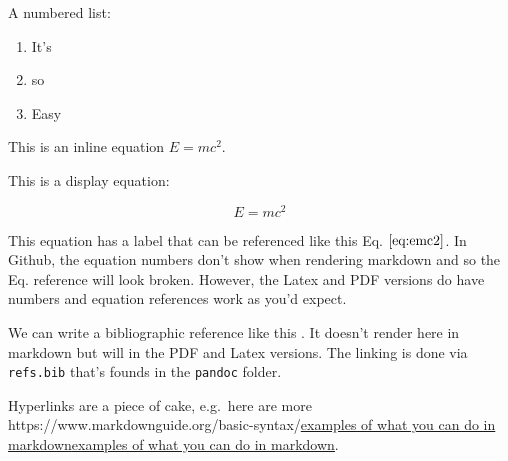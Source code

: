 \documentclass[
]{article}
\let\oldhref\href
\renewcommand{\href}[2]{\ifx#1\urlprefix\oldhref{#1}{#2}\else\uline{\oldhref{#1}{#2}}\fi}
\renewcommand{\[}{\begin{equation}}
\renewcommand{\]}{\end{equation}}
\providecommand{\tightlist}{%
  \setlength{\itemsep}{0pt}\setlength{\parskip}{0pt}}
\begin{document}
A numbered list:

\begin{enumerate}
\def\labelenumi{\arabic{enumi}.}
\tightlist
\item
  It's
\item
  so
\item
  Easy
\end{enumerate}

This is an inline equation \(E=mc^2\).

This is a display equation:

\[
E = mc^2
\label{eq:emc2}
\]

This equation has a label that can be referenced like this Eq.
\(\ref{eq:emc2}\). In Github, the equation numbers don't show when
rendering markdown and so the Eq. reference will look broken. However,
the Latex and PDF versions do have numbers and equation references work
as you'd expect.

We can write a bibliographic reference like this
\autocite{einstein1905}. It doesn't render here in markdown but will in
the PDF and Latex versions. The linking is done via \texttt{refs.bib}
that's founds in the \texttt{pandoc} folder.

Hyperlinks are a piece of cake, e.g.~here are more
\href{https://www.markdownguide.org/basic-syntax/}{examples of what you
can do in markdown}.

\printbibliography
\end{document}
